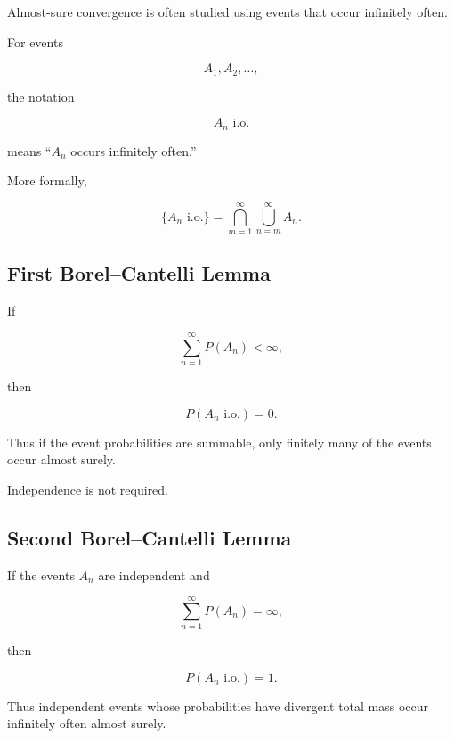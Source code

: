 Almost-sure convergence is often studied using events that occur
infinitely often.

For events

\[
A_1,A_2,\ldots,
\]

the notation

\[
\boxed{
A_n
\text{ i.o.}
}
\]

means ``\(A_n\) occurs infinitely often.''

More formally,

\[
\boxed{
\{A_n\text{ i.o.}\}
=
\bigcap_{m=1}^{\infty}
\bigcup_{n=m}^{\infty}
A_n.
}
\]

\subsection{First Borel--Cantelli Lemma}
\label{subsec:first-borel-cantelli}

\begin{theorem}
If

\[
\sum_{n=1}^{\infty}
P(A_n)
<
\infty,
\]

then

\[
\boxed{
P(A_n\text{ i.o.})=0.
}
\]
\end{theorem}

Thus if the event probabilities are summable, only finitely many of the
events occur almost surely.

Independence is not required.

\subsection{Second Borel--Cantelli Lemma}
\label{subsec:second-borel-cantelli}

\begin{theorem}
If the events \(A_n\) are independent and

\[
\sum_{n=1}^{\infty}
P(A_n)
=
\infty,
\]

then

\[
\boxed{
P(A_n\text{ i.o.})=1.
}
\]
\end{theorem}

Thus independent events whose probabilities have divergent total mass
occur infinitely often almost surely.

